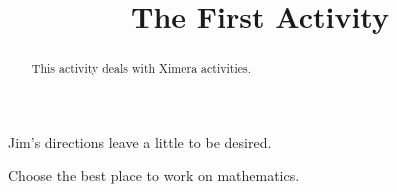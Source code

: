 \documentclass{ximera}
\title{The First Activity}
\begin{document}
  
	\begin{abstract}  
		This activity deals with Ximera activities.  
	\end{abstract}  
	\maketitle  
	Jim's directions leave a little to be desired.  
	\begin{exercise}  
		Choose the best place to work on mathematics.  
		\begin{multipleChoice}  
		\end{multipleChoice}  
	\end{exercise}  
\end{document}
